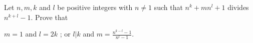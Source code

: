 Let 
$n, m, k$
 and 
$l$
 be positive integers with 
$n \neq 1$
 such that 
$n^k + mn^l + 1$
 divides 
$n^{k+l} - 1$. 
 Prove that


$m = 1$
 and 
$l = 2k$
;
 or
$l|k$
 and 
$m = \frac{n^{k-l}-1}{n^l-1}$. 
